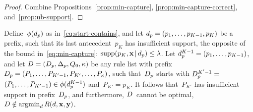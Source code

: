 \begin{arxiv}
\begin{proof}
Combine Propositions~\ref{prop:min-capture},
\ref{prop:min-capture-correct}, and~\ref{prop:ub-support}.
\end{proof}

\begin{proposition}
\label{prop:min-capture}
Define~$\phi(d_p)$ as in~\eqref{eq:start-contains},
and let ${d_p = (p_1, \dots, p_{K-1}, p_{K})}$ be a prefix,
such that its last antecedent~$p_{K}$ has insufficient support,
\ie the opposite of the bound in~\eqref{eq:min-capture}:
${\textnormal{supp}(p_K, \mathbf{x} \,|\, d_p) \le {\lambda}}$.
%
Let ${d_p^{K-1} = (p_1, \dots, p_{K-1})}$,
and let ${{D} = (D_p, \Delta_p, Q_0, \kappa)}$
be any rule list with prefix
${D_p = (P_1, \dots, P_{K'-1}, P_{K'}, \dots, P_{\kappa})}$,
such that~$D_p$ starts with ${D_p^{K'-1} =}$
${(P_1, \dots, P_{K'-1}) \in \phi(d_p^{K-1})}$
and~${P_{K'} = p_{K}}$.
%
It follows that~$P_{K'}$ has insufficient support in
prefix~$D_p$, and furthermore, ${D}$~cannot be optimal,
\ie ${{D} \notin \operatorname*{argmin}_{{d}} R({d}, \mathbf{x}, \mathbf{y})}$.
\end{proposition}


\end{arxiv}
